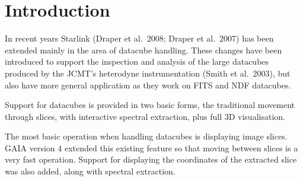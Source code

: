 \documentclass[11pt,twoside]{article}  %
\begin{document}
%
%

\section{Introduction}

In recent years Starlink 
(Draper et al.\ 2008; Draper et al.\ 2007) has been extended mainly in the
area of datacube handling. These changes have been introduced to support the
inspection and analysis of the large datacubes produced by the JCMT's
heterodyne instrumentation (Smith et al.\ 2003), but also have more general
application as they work on FITS and
 NDF datacubes.

Support for datacubes is provided in two basic forms, the traditional movement
through slices, with interactive spectral extraction, plus full 3D
visualisation.

The most basic operation when handling datacubes is displaying image
slices. GAIA version 4 extended this existing feature so that moving between
slices is a very fast operation. Support for displaying the coordinates of the
extracted slice was also added, along with spectral extraction.
\end{document}
